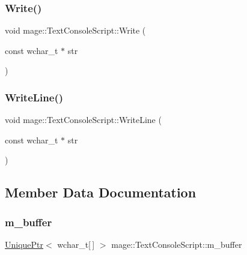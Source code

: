 \hypertarget{classmage_1_1_text_console_script_a659586a498f8ff0f55aa2a3f25f0828b}{}\label{classmage_1_1_text_console_script_a659586a498f8ff0f55aa2a3f25f0828b} 
\subsubsection{\texorpdfstring{Write()}{Write()}}
{\footnotesize\ttfamily void mage\+::\+Text\+Console\+Script\+::\+Write (\begin{DoxyParamCaption}\item[{const wchar\+\_\+t $\ast$}]{str }\end{DoxyParamCaption})}

\hypertarget{classmage_1_1_text_console_script_a24fe33795c69e70d07a680826cfafcc1}{}\label{classmage_1_1_text_console_script_a24fe33795c69e70d07a680826cfafcc1} 
\subsubsection{\texorpdfstring{Write\+Line()}{WriteLine()}}
{\footnotesize\ttfamily void mage\+::\+Text\+Console\+Script\+::\+Write\+Line (\begin{DoxyParamCaption}\item[{const wchar\+\_\+t $\ast$}]{str }\end{DoxyParamCaption})}



\subsection{Member Data Documentation}
\hypertarget{classmage_1_1_text_console_script_a526410b1b43646948809b772c5446346}{}\label{classmage_1_1_text_console_script_a526410b1b43646948809b772c5446346} 
\subsubsection{\texorpdfstring{m\+\_\+buffer}{m\_buffer}}
{\footnotesize\ttfamily \hyperlink{namespacemage_a3316d7143a973e37adf1110f2e80ca31}{Unique\+Ptr}$<$ wchar\+\_\+t\mbox{[}$\,$\mbox{]} $>$ mage\+::\+Text\+Console\+Script\+::m\+\_\+buffer\hspace{0.3cm}{\ttfamily [private]}}

